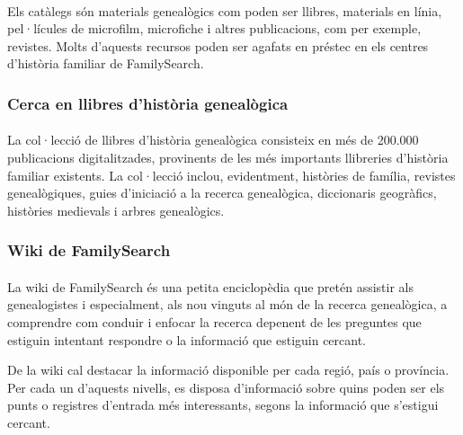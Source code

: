         \paragraph{}
        Els catàlegs són materials genealògics com poden ser llibres, materials en línia, pel·lícules de microfilm, microfiche i altres publicacions, com per exemple, revistes. Molts d’aquests recursos poden ser agafats en préstec en els centres d’història familiar de FamilySearch.


    \subsubsection{Cerca en llibres d'història genealògica}

        \paragraph{}
        La col·lecció de llibres d’història genealògica consisteix en més de 200.000 pu\-bli\-ca\-cions digitalitzades, provinents de les més importants llibreries d’història fa\-mi\-liar e\-xis\-tents. La col·lecció inclou, evidentment, històries de família, revistes ge\-nea\-lò\-gi\-ques, guies d’iniciació a la recerca genealògica, diccionaris geogràfics, històries medievals i arbres genealògics.


    \subsubsection{Wiki de FamilySearch}

        \paragraph{}
        La wiki de FamilySearch és una petita enciclopèdia que pretén assistir als genealogistes i especialment, als nou vinguts al món de la recerca genealògica, a comprendre com conduir i enfocar la recerca depenent de les preguntes que estiguin intentant respondre o la informació que estiguin cercant.

        De la wiki cal destacar la informació disponible per cada regió, país o província. Per cada un d'aquests nivells, es disposa d'informació sobre quins poden ser els punts o registres d’entrada més interessants, segons la informació que s'estigui cercant.
